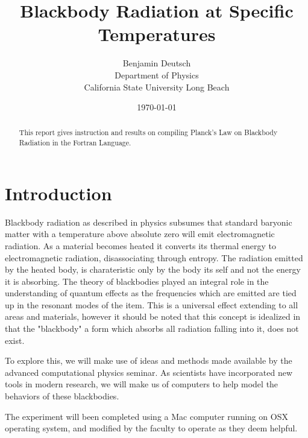 \documentclass[12pt]{article}
\begin{document}




\title{Blackbody Radiation at Specific Temperatures}
\author{Benjamin Deutsch  \\
Department of Physics\\
California State University Long Beach}
\date{\today }

  
\maketitle



\begin{abstract}
This report gives instruction and results on compiling Planck's Law on Blackbody Radiation in the Fortran Language.
\end{abstract}

\section{Introduction}

Blackbody radiation as described in physics subsumes that standard baryonic matter with a temperature above absolute zero will emit electromagnetic radiation. 
As a material becomes heated it converts its thermal energy to electromagnetic radiation, disassociating through entropy. The radiation emitted by the heated body, is charateristic only by the body its self and not the energy it is absorbing. The theory of blackbodies played an integral role in the understanding of quantum effects as the frequencies which are emitted are tied up in the resonant modes of the item. This is a universal effect extending to all areas and materials, however it should be noted that this concept is idealized in that the "blackbody" a form which absorbs all radiation falling into it, does not exist.

To explore this, we will make use of ideas and methods made available by the advanced computational physics seminar.
As scientists have incorporated new tools in modern research, we will make us of computers to help model the behaviors of these blackbodies. 

The experiment will been completed using a Mac computer running on OSX operating system, and modified by the faculty to operate as they deem helpful.
\end{document}
